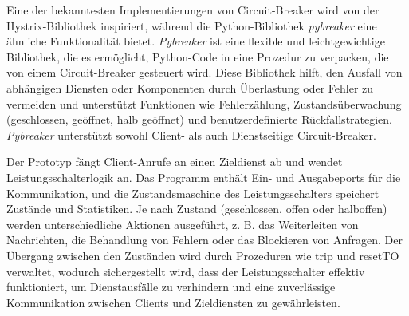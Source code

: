 Eine der bekanntesten Implementierungen von Circuit-Breaker wird von der Hystrix-Bibliothek inspiriert,
während die Python-Bibliothek \textit{pybreaker} eine ähnliche Funktionalität bietet.
\textit{Pybreaker} ist eine flexible und leichtgewichtige Bibliothek, die es ermöglicht,
Python-Code in eine Prozedur zu verpacken, die von einem Circuit-Breaker gesteuert wird.
Diese Bibliothek hilft, den Ausfall von abhängigen Diensten oder Komponenten durch Überlastung
oder Fehler zu vermeiden und unterstützt Funktionen wie Fehlerzählung,
Zustandsüberwachung (geschlossen, geöffnet, halb geöffnet) und benutzerdefinierte Rückfallstrategien. %
\textit{Pybreaker} unterstützt sowohl Client- als auch Dienstseitige Circuit-Breaker.



Der Prototyp fängt Client-Anrufe an einen
Zieldienst ab und wendet Leistungsschalterlogik an. Das Programm enthält
 Ein- und Ausgabeports für die Kommunikation, und die Zustandsmaschine
des Leistungsschalters speichert Zustände und Statistiken. Je nach
Zustand (geschlossen, offen oder halboffen) werden unterschiedliche
Aktionen ausgeführt, z. B. das Weiterleiten von Nachrichten, die
Behandlung von Fehlern oder das Blockieren von Anfragen. Der Übergang
zwischen den Zuständen wird durch Prozeduren wie trip und resetTO
verwaltet, wodurch sichergestellt wird, dass der Leistungsschalter
effektiv funktioniert, um Dienstausfälle zu verhindern und eine
zuverlässige Kommunikation zwischen Clients und Zieldiensten zu
gewährleisten.



